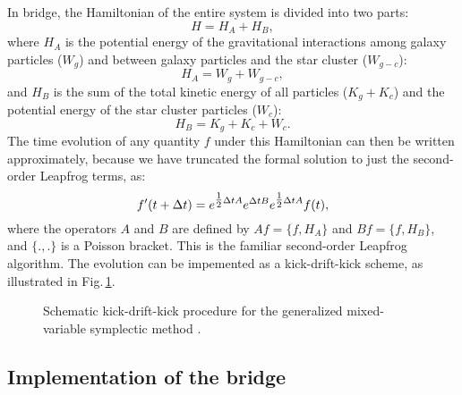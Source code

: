 In bridge, the Hamiltonian of the entire system is divided into two
parts:
\begin{equation}
        H  =  H_A + H_B,
\end{equation}
where $H_A$ is the potential energy of the gravitational interactions
among galaxy particles ($W_g$) and between galaxy particles
and the star cluster ($W_{g-c}$):
\begin{equation}
        H_A  =  W_g + W_{g-c},
\end{equation}
and $H_B$ is the sum of the total kinetic energy of all particles
($K_g + K_c$) and the potential energy of the star cluster particles
($W_c$):
\begin{equation}
        H_B  =  K_g + K_c + W_c.
\end{equation}
The time evolution of any quantity $f$ under this Hamiltonian can then
be written approximately, because we have truncated the formal
solution to just the second-order Leapfrog terms, as:
\begin{equation}
        f^\prime (t+\Delta t) = e^{\mbox{${\frac{1}{2}}$} \Delta t A} e^{\Delta t B}
						  e^{\mbox{${\frac{1}{2}}$} \Delta t A} f(t),
\end{equation}
where the operators $A$ and $B$ are defined by $Af = \{f,H_A\}$ and
$Bf = \{f,H_B\}$, and $\{.,.\}$ is a Poisson bracket.  This is the
familiar second-order Leapfrog algorithm.  The evolution can be
impemented as a kick-drift-kick scheme, as illustrated in
Fig.\,\ref{Fig:bridge}.

\begin{figure}[h] 
\caption[]{Schematic kick-drift-kick procedure for the generalized 
           mixed-variable symplectic method \cite{1991AJ....102.1528W}.
           \label{Fig:bridge} }
\end{figure}


\subsection{Implementation of the bridge}

